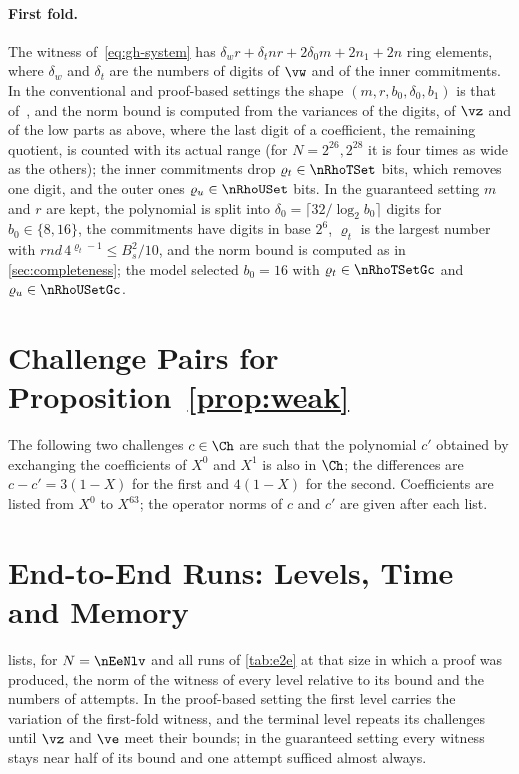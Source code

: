 \paragraph{First fold.}
The witness of~\eqref{eq:gh-system} has $\delta_wr+\delta_tnr+2\delta_0m+2n_1+2n$ ring elements, where $\delta_w$ and $\delta_t$ are the numbers of digits of $\vw$ and of the inner commitments. In the conventional and proof-based settings the shape $(m,r,b_0,\delta_0,b_1)$ is that of~\cite[Table~4]{NS24}, and the norm bound is computed from the variances of the digits, of $\vz$ and of the low parts as above, where the last digit of a coefficient, the remaining quotient, is counted with its actual range (for $N=2^{26},2^{28}$ it is four times as wide as the others); the inner commitments drop $\varrho_t\in\nRhoTSet$ bits, which removes one digit, and the outer ones $\varrho_u\in\nRhoUSet$ bits. In the guaranteed setting $m$ and $r$ are kept, the polynomial is split into $\delta_0=\lceil32/\log_2b_0\rceil$ digits for $b_0\in\{8,16\}$, the commitments have digits in base $2^6$, $\varrho_t$ is the largest number with $rnd\,4^{\varrho_t-1}\le B_s^2/10$, and the norm bound is computed as in \cref{sec:completeness}; the model selected $b_0=16$ with $\varrho_t\in\nRhoTSetGc$ and $\varrho_u\in\nRhoUSetGc$.

\section{Challenge Pairs for Proposition~\ref{prop:weak}}\label{app:pairs}

The following two challenges $c\in\Ch$ are such that the polynomial $c'$ obtained by exchanging the coefficients of $X^0$ and $X^1$ is also in $\Ch$; the differences are $c-c'=3(1-X)$ for the first and $4(1-X)$ for the second. Coefficients are listed from $X^0$ to $X^{63}$; the operator norms of $c$ and $c'$ are given after each list.



\section{End-to-End Runs: Levels, Time and Memory}\label{app:e2e}

 lists, for $N=\nEeNlv$ and all runs of \cref{tab:e2e} at that size in which a proof was produced, the norm of the witness of every level relative to its bound and the numbers of attempts. In the proof-based setting the first level carries the variation of the first-fold witness, and the terminal level repeats its challenges until $\vz$ and $\ve$ meet their bounds; in the guaranteed setting every witness stays near half of its bound and one attempt sufficed almost always.


